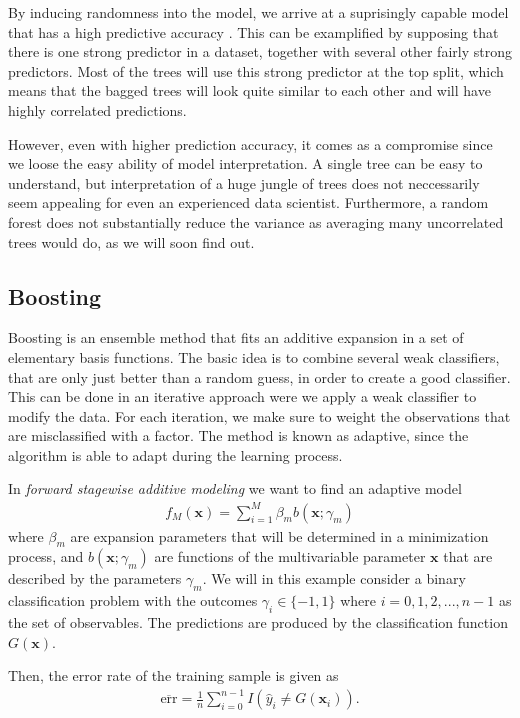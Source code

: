 By inducing randomness into the model, we arrive at a suprisingly capable model that has a high predictive accuracy \cite{Caruana2006}. This can be examplified by supposing that there is one strong predictor in a dataset, together with several other fairly strong predictors. Most of the trees will use this strong predictor at the top split, which means that the bagged trees will look quite similar to each other and will have highly correlated predictions.

However, even with higher prediction accuracy, it comes as a compromise since we loose the easy ability of model interpretation. A single tree can be easy to understand, but interpretation of a huge jungle of trees does not neccessarily seem appealing for even an experienced data scientist. Furthermore, a random forest does not substantially reduce the variance as averaging many uncorrelated trees would do, as we will soon find out.

\subsection{Boosting}

Boosting is an ensemble method that fits an additive expansion in a set of elementary basis functions. The basic idea is to combine several weak classifiers, that are only just better than a random guess, in order to create a good classifier. This can be done in an iterative approach were we apply a weak classifier to modify the data. For each iteration, we make sure to weight the observations that are misclassified with a factor. The method is known as adaptive, since the algorithm is able to adapt during the learning process.

In \textit{forward stagewise additive modeling} we want to find an adaptive model
\begin{align}
  f_M (\textbf{x}) = \sum_{i=1}^M \beta_m b(\textbf{x}; \gamma_m)
\end{align}
where $\beta_m$ are expansion parameters that will be determined in a minimization process, and $b(\textbf{x};\gamma_m)$ are functions of the multivariable parameter $\textbf{x}$ that are described by the parameters $\gamma_m$. We will in this example consider a binary classification problem with the outcomes $\gamma_i \in \{-1,1\}$ where $i=0,1,2,...,n-1$ as the set of observables. The predictions are produced by the classification function $G(\textbf{x})$.

Then, the error rate of the training sample is given as
\begin{align}
  \overline{\text{err}} = \frac{1}{n} \sum_{i=0}^{n-1} I(\hat{y}_i \neq G(\textbf{x}_i)).
\end{align}

